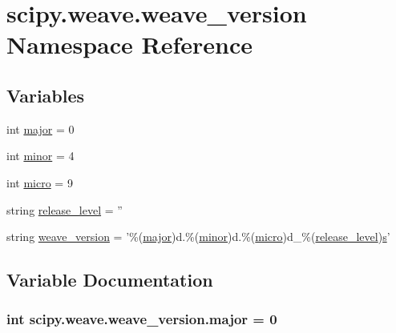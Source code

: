 \hypertarget{namespacescipy_1_1weave_1_1weave__version}{}\section{scipy.\+weave.\+weave\+\_\+version Namespace Reference}
\label{namespacescipy_1_1weave_1_1weave__version}
\subsection*{Variables}
\begin{DoxyCompactItemize}
\item 
int \hyperlink{namespacescipy_1_1weave_1_1weave__version_a56df4397205cd7d31fa40f115622cd98}{major} = 0
\item 
int \hyperlink{namespacescipy_1_1weave_1_1weave__version_a5bfa4eafda553cdb93c0a94cccfd9d12}{minor} = 4
\item 
int \hyperlink{namespacescipy_1_1weave_1_1weave__version_a3b1b2e322831709fbd733cb43b4b4f08}{micro} = 9
\item 
string \hyperlink{namespacescipy_1_1weave_1_1weave__version_a6d3158847030f5cc6f49a4d8a4dd25ae}{release\+\_\+level} = ''
\item 
string \hyperlink{namespacescipy_1_1weave_1_1weave__version_a848bf6635060ab09eb4cde729318b45f}{weave\+\_\+version} = '\%(\hyperlink{namespacescipy_1_1weave_1_1weave__version_a56df4397205cd7d31fa40f115622cd98}{major})d.\%(\hyperlink{namespacescipy_1_1weave_1_1weave__version_a5bfa4eafda553cdb93c0a94cccfd9d12}{minor})d.\%(\hyperlink{namespacescipy_1_1weave_1_1weave__version_a3b1b2e322831709fbd733cb43b4b4f08}{micro})d\+\_\+\%(\hyperlink{namespacescipy_1_1weave_1_1weave__version_a6d3158847030f5cc6f49a4d8a4dd25ae}{release\+\_\+level})\hyperlink{indexexpr_8h_ae024b0db549122b44c349ae28ec990dc}{s}'
\end{DoxyCompactItemize}


\subsection{Variable Documentation}
\hypertarget{namespacescipy_1_1weave_1_1weave__version_a56df4397205cd7d31fa40f115622cd98}{}
\subsubsection[{major}]{\setlength{\rightskip}{0pt plus 5cm}int scipy.\+weave.\+weave\+\_\+version.\+major = 0}\label{namespacescipy_1_1weave_1_1weave__version_a56df4397205cd7d31fa40f115622cd98}
\hypertarget{namespacescipy_1_1weave_1_1weave__version_a3b1b2e322831709fbd733cb43b4b4f08}{}
